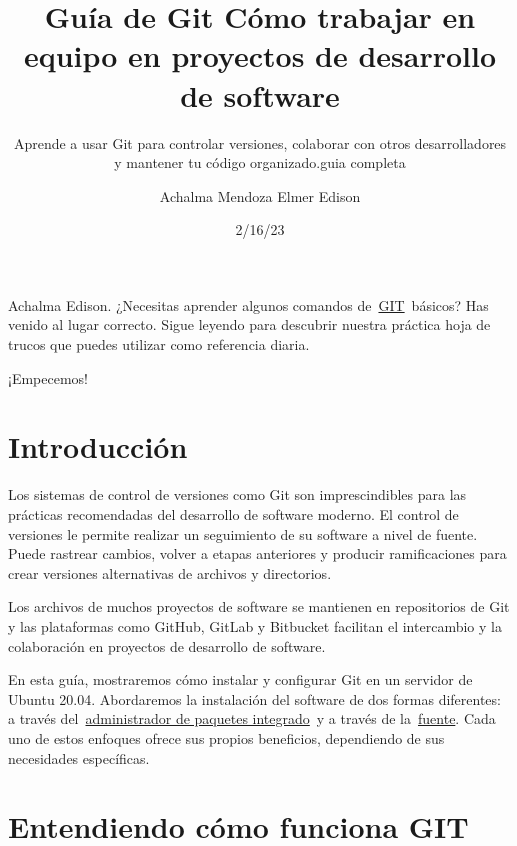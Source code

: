 \documentclass[
  a2paper,
]{article}
\title{Guía de Git Cómo trabajar en equipo en proyectos de desarrollo de
software}
\subtitle{Aprende a usar Git para controlar versiones, colaborar con
otros desarrolladores y mantener tu código organizado.guia completa}
\author{Achalma Mendoza Elmer Edison}
\date{2/16/23}
\renewcommand*\contentsname{Table of contents}
\newcommand\contentsname{Table of contents}
\begin{document}
\maketitle
\ifdefined\Shaded\renewenvironment{Shaded}{\begin{tcolorbox}[borderline west={3pt}{0pt}{shadecolor}, sharp corners, boxrule=0pt, enhanced, frame hidden, breakable, interior hidden]}{\end{tcolorbox}}\fi

\renewcommand*\contentsname{Contenidos}
{
\hypersetup{linkcolor=}
\setcounter{tocdepth}{1}
\tableofcontents
}
\listoffigures
\listoftables
Achalma Edison. ¿Necesitas aprender algunos comandos
de~\href{https://git-scm.com/}{GIT}~básicos? Has venido al lugar
correcto. Sigue leyendo para descubrir nuestra práctica hoja de trucos
que puedes utilizar como referencia diaria.

¡Empecemos!

\hypertarget{introducciuxf3n}{%
\section{Introducción}\label{introducciuxf3n}}

Los sistemas de control de versiones como Git son imprescindibles para
las prácticas recomendadas del desarrollo de software moderno. El
control de versiones le permite realizar un seguimiento de su software a
nivel de fuente. Puede rastrear cambios, volver a etapas anteriores y
producir ramificaciones para crear versiones alternativas de archivos y
directorios.

Los archivos de muchos proyectos de software se mantienen en
repositorios de Git y las plataformas como GitHub, GitLab y Bitbucket
facilitan el intercambio y la colaboración en proyectos de desarrollo de
software.

En esta guía, mostraremos cómo instalar y configurar Git en un servidor
de Ubuntu 20.04. Abordaremos la instalación del software de dos formas
diferentes: a través
del~\href{https://www.digitalocean.com/community/tutorials/how-to-install-git-on-ubuntu-18-04\#installing-git-with-default-packages}{administrador
de paquetes integrado}~y a través de
la~\href{https://www.digitalocean.com/community/tutorials/how-to-install-git-on-ubuntu-20-04\#installing-git-from-source}{fuente}.
Cada uno de estos enfoques ofrece sus propios beneficios, dependiendo de
sus necesidades específicas.

\hypertarget{entendiendo-cuxf3mo-funciona-git}{%
\section{Entendiendo cómo funciona
GIT}\label{entendiendo-cuxf3mo-funciona-git}}
\end{document}
